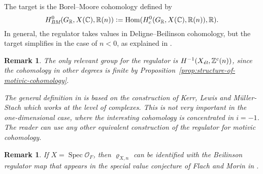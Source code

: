 \documentclass[draft]{article}
\DeclareMathOperator{\Hom}{Hom}
\DeclareMathOperator{\Spec}{Spec}
\newcommand{\CC}{\mathbb{C}}
\newcommand{\RR}{\mathbb{R}}
\newcommand{\ZZ}{\mathbb{Z}}
\newcommand{\BM}{\text{\it BM}}
\newcommand{\et}{\text{\it \'{e}t}}
\newcommand{\dfn}{\mathrel{\mathop:}=}
\theoremstyle{myplain}
\theoremstyle{mydefinition}
\newtheorem{remark}[theorem]{Remark}
\begin{document}
The target is the Borel--Moore cohomology defined by
\[ H^0_\BM (G_\RR, X(\CC), \RR(n)) \dfn
  \Hom (H^0_c (G_\RR, X(\CC), \RR(n)), \RR). \]
In general, the regulator takes values in Deligne--Beilinson cohomology, but the
target simplifies in the case of $n < 0$, as explained in
\cite[\S 2]{Beshenov-Weil-etale-2}.

\begin{remark}
  The only relevant group for the regulator is $H^{-1} (X_\et, \ZZ^c (n))$,
  since the cohomology in other degrees is finite by
  Proposition~\ref{prop:structure-of-motivic-cohomology}.

  The general definition in \cite[\S 2]{Beshenov-Weil-etale-2} is based on the
  construction of Kerr, Lewis and M\"{u}ller-Stach
  \cite{Kerr-Lewis-Muller-Stach-2006} which works at the level of
  complexes. This is not very important in the one-dimensional case, where the
  interesting cohomology is concentrated in $i = -1$. The reader can use any
  other equivalent construction of the regulator for motivic cohomology.
\end{remark}

\begin{remark}
  If $X = \Spec \mathcal{O}_F$, then $\varrho_{X,n}$ can be identified with the
  Beilinson regulator map that appears in the special value conjecture of Flach
  and Morin in \cite[\S 5.8.3]{Flach-Morin-2018}.
\end{remark}
\end{document}
